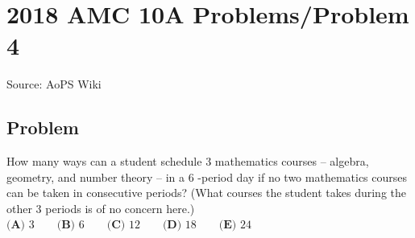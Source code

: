\documentclass[12pt]{article}
\begin{document}
\section*{{2018 AMC 10A Problems/Problem 4}}
Source: AoPS Wiki

\subsection*{Problem}
How many ways can a student schedule $3$ mathematics courses -- algebra, geometry, and number theory -- in a $6$ -period day if no two mathematics courses can be taken in consecutive periods? (What courses the student takes during the other $3$ periods is of no concern here.) $\textbf{(A) }3\qquad\textbf{(B) }6\qquad\textbf{(C) }12\qquad\textbf{(D) }18\qquad\textbf{(E) }24$
\end{document}
